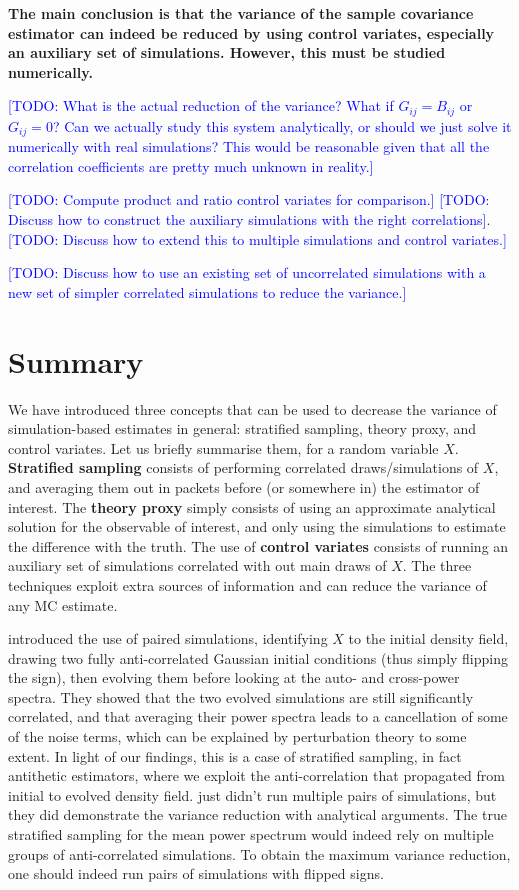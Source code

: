 \documentclass{aastex6}
\newcommand{\todo}[1]{\textcolor{blue}{[TODO: #1]}}
\begin{document}
\textbf{The main conclusion is that the variance of the sample covariance estimator can indeed be reduced by using control variates, especially an auxiliary set of simulations. However, this must be studied numerically.}

\todo{What is the actual reduction of the variance? What if $G_{ij}=B_{ij}$ or $G_{ij} = 0$? Can we actually study this system analytically, or should we just solve it numerically with real simulations? This would be reasonable given that all the correlation coefficients are pretty much unknown in reality.}

\todo{Compute product and ratio control variates for comparison.}
\todo{Discuss how to construct the auxiliary simulations with the right correlations}.
\todo{Discuss how to extend this to multiple simulations and control variates.}

\todo{Discuss how to use an existing set of uncorrelated simulations with a new set of simpler correlated simulations to reduce the variance.}

\section{Summary}

We have introduced three concepts that can be used to decrease the variance of simulation-based estimates in general: stratified sampling, theory proxy, and control variates. 
Let us briefly summarise them, for a random variable $X$.
\textbf{Stratified sampling} consists of performing correlated draws/simulations of $X$, and averaging them out in packets before (or somewhere in) the estimator of interest. 
The \textbf{theory proxy} simply consists of using an approximate analytical solution for the observable of interest, and only using the simulations to estimate the difference with the truth. 
The use of \textbf{control variates} consists of running an auxiliary set of simulations correlated with out main draws of $X$.
The three techniques exploit extra sources of information and can reduce the variance of any MC estimate. 

\cite{PontzenEtAl2016} introduced the use of paired simulations, identifying $X$ to the initial density field, drawing two fully anti-correlated Gaussian initial conditions (thus simply flipping the sign), then evolving them before looking at the auto- and cross-power spectra.
They showed that the two evolved simulations are still significantly correlated, and that averaging their power spectra leads to a cancellation of some of the noise terms, which can be explained by perturbation theory to some extent. 
In light of our findings, this is a case of stratified sampling, in fact antithetic estimators, where we exploit the anti-correlation that propagated from initial to evolved density field. 
\cite{PontzenEtAl2016} just didn't run multiple pairs of simulations, but they did demonstrate the variance reduction with analytical arguments.
The true stratified sampling for the mean power spectrum would indeed rely on multiple groups of anti-correlated simulations. To obtain the maximum variance reduction, one should indeed run pairs of simulations with flipped signs.
\end{document}

